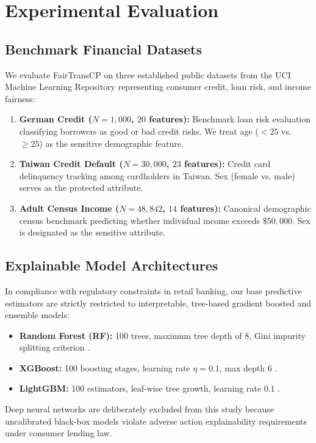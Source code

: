 \documentclass[conference]{IEEEtran}
\begin{document}
\section{Experimental Evaluation}

\subsection{Benchmark Financial Datasets}
We evaluate FairTransCP on three established public datasets from the UCI Machine Learning Repository representing consumer credit, loan risk, and income fairness:
\begin{enumerate}
    \item \textbf{German Credit ($N=1{,}000$, $20$ features):} Benchmark loan risk evaluation classifying borrowers as good or bad credit risks. We treat age ($<25$ vs. $\ge 25$) as the sensitive demographic feature.
    \item \textbf{Taiwan Credit Default ($N=30{,}000$, $23$ features):} Credit card delinquency tracking among cardholders in Taiwan. Sex (female vs. male) serves as the protected attribute.
    \item \textbf{Adult Census Income ($N=48{,}842$, $14$ features):} Canonical demographic census benchmark predicting whether individual income exceeds $\$50{,}000$. Sex is designated as the sensitive attribute.
\end{enumerate}

\subsection{Explainable Model Architectures}
In compliance with regulatory constraints in retail banking, our base predictive estimators are strictly restricted to interpretable, tree-based gradient boosted and ensemble models:
\begin{itemize}
    \item \textbf{Random Forest (RF):} 100 trees, maximum tree depth of 8, Gini impurity splitting criterion \cite{breiman2001random}.
    \item \textbf{XGBoost:} 100 boosting stages, learning rate $\eta = 0.1$, max depth 6 \cite{chen2016xgboost}.
    \item \textbf{LightGBM:} 100 estimators, leaf-wise tree growth, learning rate $0.1$ \cite{ke2017lightgbm}.
\end{itemize}
Deep neural networks are deliberately excluded from this study because uncalibrated black-box models violate adverse action explainability requirements under consumer lending law.
\end{document}
